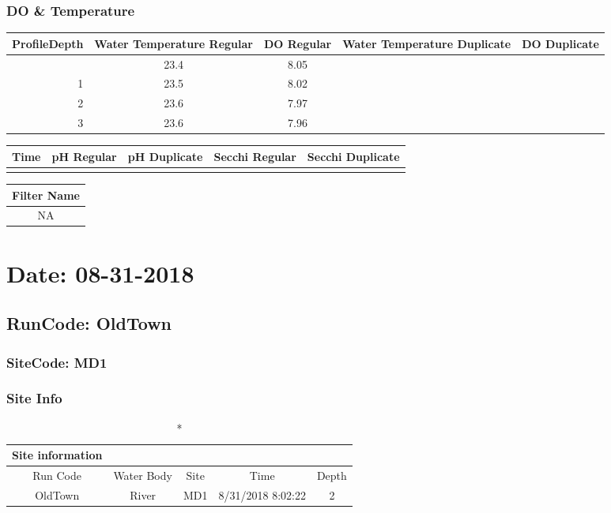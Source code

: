 \documentclass[
  letterpaper,
  DIV=11,
  numbers=noendperiod]{scrartcl}
\begin{document}
\subsubsection{DO \& Temperature}

\begin{longtable*}{rcccc}
\toprule
ProfileDepth & Water Temperature Regular & DO Regular & Water Temperature Duplicate & DO Duplicate \\ 
\midrule{} & 23.4 & 8.05 &  &  \\ 
1 & 23.5 & 8.02 &  &  \\ 
2 & 23.6 & 7.97 &  &  \\ 
3 & 23.6 & 7.96 &  &  \\ 
\bottomrule
\end{longtable*}

\begin{longtable*}{lllll}
\toprule
Time & pH Regular & pH Duplicate & Secchi Regular & Secchi Duplicate \\ 
\midrule\addlinespace[2.5pt]
\bottomrule
\end{longtable*}

\begin{longtable*}{c}
\toprule
Filter Name \\ 
\midrule\addlinespace[2.5pt]
NA \\ 
\bottomrule
\end{longtable*}

\hypertarget{date-08-31-2018-1}{%
\section{Date: 08-31-2018}\label{date-08-31-2018-1}}

\hypertarget{runcode-oldtown-3}{%
\subsection{RunCode: OldTown}\label{runcode-oldtown-3}}

\hypertarget{sitecode-md1-1}{%
\subsubsection{SiteCode: MD1}\label{sitecode-md1-1}}

\subsubsection{Site Info}

\begin{longtable*}{ccccc}
\caption*{
{\large Site information}
} \\ 
\toprule
Run Code & Water Body & Site & Time & Depth \\ 
\midrule\addlinespace[2.5pt]
OldTown & River & MD1 & 8/31/2018 8:02:22 & 2 \\ 
\bottomrule
\end{longtable*}
\end{document}
